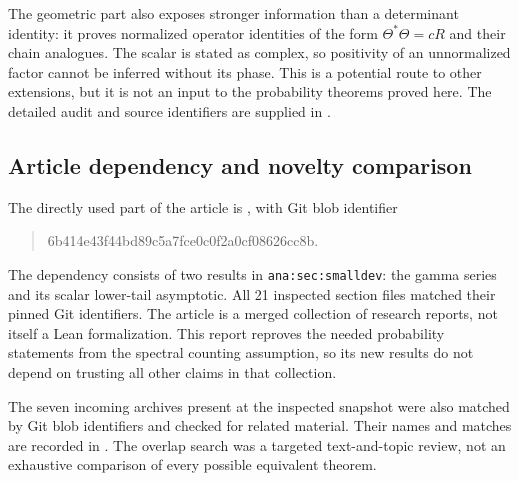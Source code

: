 The geometric part also exposes stronger information than a
determinant identity: it proves normalized operator identities of
the form $\Theta^*\Theta=cR$ and their chain analogues. The scalar is
stated as complex, so positivity of an unnormalized factor cannot be
inferred without its phase. This is a potential route to other
extensions, but it is not an input to the probability theorems proved
here. The detailed audit and source identifiers are supplied in
.

\subsection{Article dependency and novelty comparison}

The directly used part of the article is
, with Git blob identifier
\begin{quote}\small\ttfamily
6b414e43f44bd89c5a7fce0c0f2a0cf08626cc8b.
\end{quote}
The dependency consists of two results in \texttt{ana:sec:smalldev}:
the gamma series and its scalar lower-tail asymptotic.
All 21 inspected section files matched
their pinned Git identifiers. The article is a merged collection of
research reports, not itself a Lean formalization. This report
reproves the needed probability statements from the spectral counting
assumption, so its new results do not depend on trusting all other
claims in that collection.

The seven incoming archives present at the inspected snapshot were
also matched by Git blob identifiers and checked for related material.
Their names and matches are recorded in
. The overlap search was
a targeted text-and-topic review, not an exhaustive comparison of
every possible equivalent theorem.

